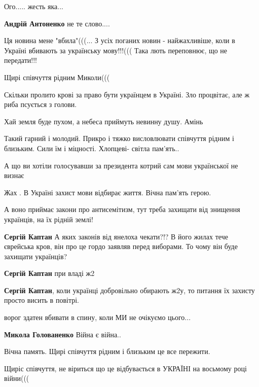 \begin{itemize}

Ого..... жесть яка...

\textbf{Андрій Антоненко} не те слово....


Ця новина мене "вбила"(((... З усіх поганих новин - найжахливіше, коли в
Україні вбивають за українську мову!!!((( Така лють переповнює, що не
передати!!!

Щирі співчуття рідним Миколи(((



Скільки пролито крові за право бути українцем в Україні. Зло процвітає, але ж
риба псується з голови.

Хай земля буде пухом, а небеса приймуть невинну душу. Амінь

Такий гарний і молодий. Прикро і тяжко висловлювати співчуття рідним і близьким. Сили їм і міцності. Хлопцеві- світла пам'ять..

А що ви хотіли голосувавши за президента котрий сам мови української не визнає

Жах . В Україні захист мови відбирає життя. Вічна пам'ять герою.

А воно приймає закони про антисемітизм, тут треба захищати від знищення українців, на їх рідній землі!

\begin{itemize} %
\textbf{Сергій Каптан} А яких законів від янелоха чекати?!? В його жилах тече єврейська кров, він про це гордо заявляв перед виборами. То чому він буде захищати українців?

\textbf{Сергій Каптан} при владі ж2

\textbf{Сергій Каптан}, коли українці добровільно обирають ж2у, то питання їх захисту просто висить в повітрі.
\end{itemize} %

ворог здатен вбивати в спину, коли МИ не очікуємо цього...

\textbf{Микола Голованенко} Війна є війна..

Вічна память. Щирі співчуття рідним і близьким це все пережити.

Щиріс співчуття, не віриться що це відбувається в УКРАЇНІ на восьмому році війни(((


\end{itemize}
